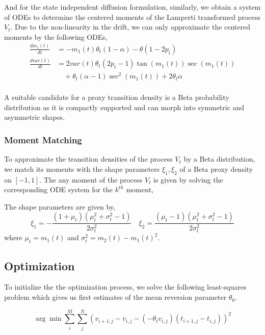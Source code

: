 \documentclass[10pt,twocolumn,letterpaper]{article}
\begin{document}
And for the state independent diffusion formulation, similarly, we  obtain a system of ODEs to determine the centered moments of the Lamperti transformed process $V_t$. Due to the non-linearity in the drift, we can only approximate the centered moments by the following ODEs,
\begin{equation}
\begin{split}
\frac{d m_1 (t)}{dt} &= - m_1(t)\theta_t (1-\alpha) - \theta (1-2 p_t) \\
\frac{d var(t)}{dt} &=  2 var(t) \theta_t (2p_t - 1 ) \tan(m_1 (t)) \sec(m_1 (t))\\
& \quad + \theta_t (\alpha - 1) \sec^2(m_1 (t))  + 2 \theta_t \alpha\\
\end{split}
\end{equation}

 A suitable candidate for a proxy transition density is a Beta probability distribution as it is compactly supported and can morph into symmetric and asymmetric shapes.

\subsubsection*{ Moment Matching}
To approximate the transition densities of  the process $V_t$ by a Beta distribution, we match its moments with the shape parameters $\xi_1, \xi_2$ of a Beta proxy density on $[-1,1]$. The any moment of the process $V_t$ is  given by solving the corresponding ODE system  for the $k^{th}$  moment,

The shape parameters are given by,
\begin{equation}
\xi_1 = - \frac{(1+\mu_t )(\mu_t^2 + \sigma_t^2 -1)}{2 \sigma_t^2} \quad \xi_2=  \frac{(\mu_t-1 )(\mu_t^2 + \sigma_t^2 -1)}{2 \sigma_t^2} \label{param_transformed_beta}
\end{equation}
where $\mu_t = m_1 (t)$ and $\sigma_t^2= m_2 (t)- m_1 (t)^2$.

\subsection{Optimization}

To initialize the the optimization process, we solve the following least-squares problem which gives us first estimates of the mean reversion parameter $\theta_0$. 

\begin{equation}
 \arg\min \sum\limits_{i}^M \sum\limits_j^N \left( v_{i+1,j}  - v_{i,j}- \left( - \theta_t v_{i,j}\right) \left(t_{i+1,j} - t_{i,j} \right)  \right)^2 
 \end{equation}
 
\end{document}
